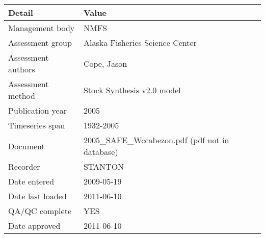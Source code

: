 \begin{table}[htb]
\centering
\begin{tabular}{lp{7cm}}
\toprule
Detail & Value \\
\midrule
Management body    & NMFS                                            \\
Assessment group   & Alaska Fisheries Science Center                 \\
Assessment authors & Cope, Jason                                     \\
Assessment method  & Stock Synthesis v2.0 model                      \\
Publication year   & 2005                                            \\
Timeseries span    & 1932-2005                                       \\
Document           & 2005\_SAFE\_Wccabezon.pdf (pdf not in database) \\
Recorder           & STANTON                                         \\
Date entered       & 2009-05-19                                      \\
Date last loaded   & 2011-06-10                                      \\
QA/QC complete     & YES                                             \\
Date approved      & 2011-06-10                                      \\
\bottomrule
\end{tabular}
\label{tab:assessdet}
\end{table}
